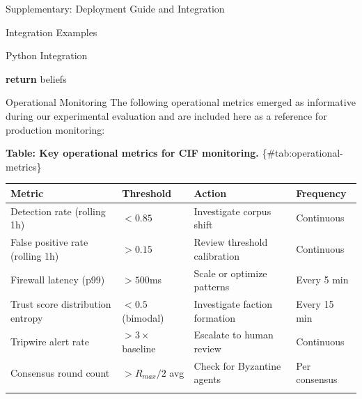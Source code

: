 \documentclass[
  ignorenonframetext,
]{beamer}
\newenvironment{Shaded}{}{}
\newcommand{\ControlFlowTok}[1]{\textcolor[rgb]{0.00,0.44,0.13}{\textbf{#1}}}
\newcommand{\NormalTok}[1]{#1}
\newcounter{none} %
\begin{document}
\begin{frame}[fragile]{Supplementary: Deployment Guide and Integration}
\begin{block}{Integration Examples}
\begin{block}{Python Integration}
\begin{Shaded}
\begin{Highlighting}[]
    \ControlFlowTok{return}\NormalTok{ beliefs}
\end{Highlighting}
\end{Shaded}
\end{block}

\begin{block}{Operational Monitoring}
\protect{}\label{sec:operational-monitoring}
The following operational metrics emerged as informative during our
experimental evaluation and are included here as a reference for
production monitoring:

\textbf{Table: Key operational metrics for CIF monitoring.}
\{\#tab:operational-metrics\}

{\def\LTcaptype{none} %
\begin{longtable}[]{@{}
  >{\raggedright\arraybackslash}p{}
  >{\raggedright\arraybackslash}p{}
  >{\raggedright\arraybackslash}p{}
  >{\raggedright\arraybackslash}p{}@{}}
\toprule\noalign{}
\begin{minipage}[b]{\linewidth}\raggedright
Metric
\end{minipage} & \begin{minipage}[b]{\linewidth}\raggedright
Threshold
\end{minipage} & \begin{minipage}[b]{\linewidth}\raggedright
Action
\end{minipage} & \begin{minipage}[b]{\linewidth}\raggedright
Frequency
\end{minipage} \\
\midrule\noalign{}
\endhead
Detection rate (rolling 1h) & \(< 0.85\) & Investigate corpus shift &
Continuous \\
False positive rate (rolling 1h) & \(> 0.15\) & Review threshold
calibration & Continuous \\
Firewall latency (p99) & \(> 500\)ms & Scale or optimize patterns &
Every 5 min \\
Trust score distribution entropy & \(< 0.5\) (bimodal) & Investigate
faction formation & Every 15 min \\
Tripwire alert rate & \(> 3\times\) baseline & Escalate to human review
& Continuous \\
Consensus round count & \(> R_{max}/2\) avg & Check for Byzantine agents
& Per consensus \\
\bottomrule\noalign{}
\end{longtable}
}


\end{block}
\end{block}
\end{frame}
\end{document}
